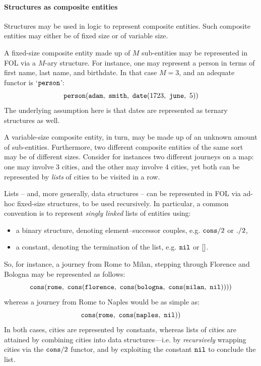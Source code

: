 \documentclass[12pt,a4paper,openright,twoside]{book}
\begin{document}

\paragraph{Structures as composite entities}

Structures may be used in logic to represent composite entities.
%
Such composite entities may either be of fixed size or of variable size.

A fixed-size composite entity made up of $M$ sub-entities may be represented in FOL via a $M$-ary structure.
%
For instance, one may represent a person in terms of first name, last name, and birthdate.
%
In that case $M = 3$, and an adequate functor is `$\mathtt{person}$':
%
$$
\functor{person}(\functor{adam},\ \functor{smith},\ \functor{date}(1723,\ \functor{june},\ 5))
$$
%
The underlying assumption here is that dates are represented as ternary structures as well.

A variable-size composite entity, in turn, may be made up of an unknown amount of sub-entities.
%
Furthermore, two different composite entities of the same sort may be of different sizes.
%
Consider for instances two different journeys on a map: one may involve 3 cities, and the other may involve 4 cities, yet both can be represented by \emph{lists} of cities to be visited in a row.

Lists -- and, more generally, data structures -- can be represented in FOL via ad-hoc fixed-size structures, to be used recursively.
%
In particular, a common convention is to represent \emph{singly linked} lists of entities using:
%
\begin{itemize}
    \item a binary structure, denoting element--successor couples, e.g. $\mathtt{cons}/2$ or $\mathtt{.}/2$,
    \item a constant, denoting the termination of the list, e.g. $\mathtt{nil}$ or $\mathtt{[]}$.
\end{itemize}
%
So, for instance, a journey from Rome to Milan, stepping through Florence and Bologna may be represented as follows:
%
\begin{equation}\label{eq:path-rome-milan}
    \mathtt{cons}(\mathtt{rome},\
        \mathtt{cons}(\mathtt{florence},\
            \mathtt{cons}(\mathtt{bologna},\
                \mathtt{cons}(\mathtt{milan},\
                    \mathtt{nil}
                )
            )
        )
    )
\end{equation}
%
whereas a journey from Rome to Naples would be as simple as:
%
\begin{equation*}
    \mathtt{cons}(\mathtt{rome},\
        \mathtt{cons}(\mathtt{naples},\
            \mathtt{nil}
        )
    )
\end{equation*}
%
In both cases, cities are represented by constants, whereas lists of cities are attained by combining cities into data structures---i.e. by \emph{recursively} wrapping cities via the $\mathtt{cons}/2$ functor, and by exploiting the constant $\mathtt{nil}$ to conclude the list.
\end{document}
